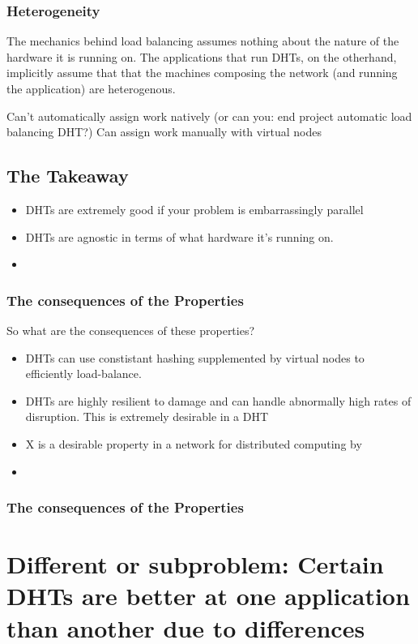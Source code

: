 \documentclass[10pt,letterpaper]{report}
\begin{document}
\subsubsection{Heterogeneity}

The mechanics behind load balancing assumes nothing about the nature of the hardware it is running on.
The applications that run DHTs, on the otherhand, implicitly assume that  that the machines composing the network (and running the application) are heterogenous.


Can't automatically assign work natively (or can you: end project automatic load balancing DHT?)
Can assign work manually with virtual nodes



\subsection{The Takeaway}


\begin{itemize}
	\item DHTs are extremely good if your problem is embarrassingly parallel
	\item DHTs are agnostic in terms of what hardware it's running on.
	\item
\end{itemize}
\subsubsection{The consequences of the Properties}
So what are the consequences of these properties?
\begin{itemize}
    \item DHTs can use constistant hashing supplemented by virtual nodes to efficiently load-balance.
	\item DHTs are highly resilient to damage and can handle abnormally high rates of disruption.  This is extremely desirable in a DHT
	\item X is a desirable property in a network for distributed computing by
	\item 
\end{itemize}


\subsubsection{The consequences of the Properties}


\section{Different or subproblem: Certain DHTs are better at one application than another due to differences}
\end{document}
